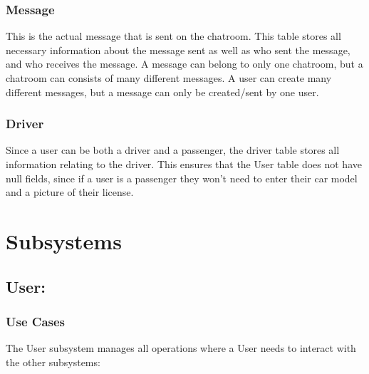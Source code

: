 \documentclass[hidelinks, 12pt, a4paper]{article}
\begin{document}
    
      \subsubsection{Message}
        This is the actual message that is sent on the chatroom. This table stores all necessary information about the message sent as well as who sent the message, and who receives the message. A message can belong to only one chatroom, but a chatroom can consists of many different messages. A user can create many different messages, but a message can only be created/sent by one user.

    \subsubsection{Driver}
    Since a user can be both a driver and a passenger, the driver table stores all information relating to the driver. This ensures that the User table does not have null fields, since if a user is a passenger they won’t need to enter their car model and a picture of their license.
         
\newpage
\section{Subsystems}
                \subsection{User:}
                \subsubsection{Use Cases}
                  The User subsystem manages all operations where a User needs to interact with the other subsystems:
                    
\end{document}
